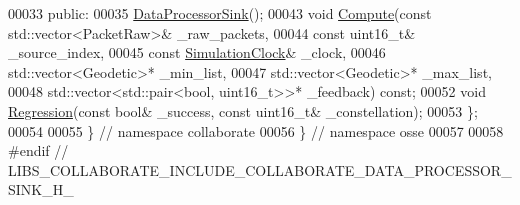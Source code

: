 \begin{DoxyCode}
00033  \textcolor{keyword}{public}:
00035   \hyperlink{classosse_1_1collaborate_1_1_data_processor_sink_a8d89873658f5237e951d066ecfdf1c37}{DataProcessorSink}();
00043   \textcolor{keywordtype}{void} \hyperlink{classosse_1_1collaborate_1_1_data_processor_sink_a42b27e2e378f110add6f55406bdbfdd4}{Compute}(\textcolor{keyword}{const} std::vector<PacketRaw>& \_raw\_packets,
00044                \textcolor{keyword}{const} uint16\_t& \_source\_index,
00045                \textcolor{keyword}{const} \hyperlink{classosse_1_1collaborate_1_1_simulation_clock}{SimulationClock}& \_clock,
00046                std::vector<Geodetic>* \_min\_list,
00047                std::vector<Geodetic>* \_max\_list,
00048                std::vector<std::pair<bool, uint16\_t>>* \_feedback) \textcolor{keyword}{const};
00052   \textcolor{keywordtype}{void} \hyperlink{classosse_1_1collaborate_1_1_data_processor_sink_a6f6dce42dffb76a6218f8d2be8bae9c4}{Regression}(\textcolor{keyword}{const} \textcolor{keywordtype}{bool}& \_success, \textcolor{keyword}{const} uint16\_t& \_constellation);
00053 \};
00054 
00055 \}  \textcolor{comment}{// namespace collaborate}
00056 \}  \textcolor{comment}{// namespace osse}
00057 
00058 \textcolor{preprocessor}{#endif  // LIBS\_COLLABORATE\_INCLUDE\_COLLABORATE\_DATA\_PROCESSOR\_SINK\_H\_}
\end{DoxyCode}
